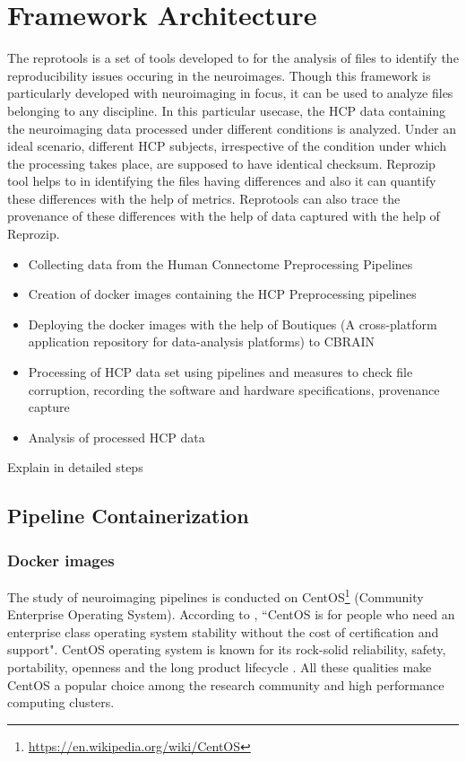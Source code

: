 \chapter{Framework Architecture}
The reprotools  is a set of tools developed to for the analysis of files to identify the reproducibility issues occuring in the neuroimages. Though this framework is particularly developed with neuroimaging in focus, it can be used to analyze files belonging to any discipline. In this particular usecase, the HCP data containing the neuroimaging data processed under different conditions is analyzed. Under an ideal scenario, different HCP subjects, irrespective of the condition under which the processing takes place, are supposed to have identical checksum. Reprozip tool helps to in identifying the files having differences and also it can quantify these differences with the help of metrics. Reprotools can also trace the provenance of these differences with the help of data captured with the help of Reprozip.

  \begin{itemize}
  \item Collecting data from the Human Connectome Preprocessing Pipelines \cite{DBHumanConnectome}
  \item Creation of docker images containing the HCP Preprocessing pipelines
  \item Deploying the docker images with the help of Boutiques (A cross-platform application repository for data-analysis platforms) to CBRAIN
  \item Processing of HCP data set using pipelines and measures to check file corruption, recording the software and hardware specifications, provenance capture
  \item Analysis of processed HCP data
  \end{itemize} 

Explain in detailed steps

\section{Pipeline Containerization}
\subsection{Docker images}
The study of neuroimaging pipelines is conducted on CentOS\footnote{\url{https://en.wikipedia.org/wiki/CentOS}} (Community Enterprise Operating System). According to \cite{CentOS}, ``CentOS is for people who need an enterprise class operating system stability without the cost of certification and support". CentOS operating system is known for its rock-solid reliability, safety, portability, openness and the long product lifecycle \cite{5665431}. All these qualities make CentOS a popular choice among the research community and
high performance computing clusters.

